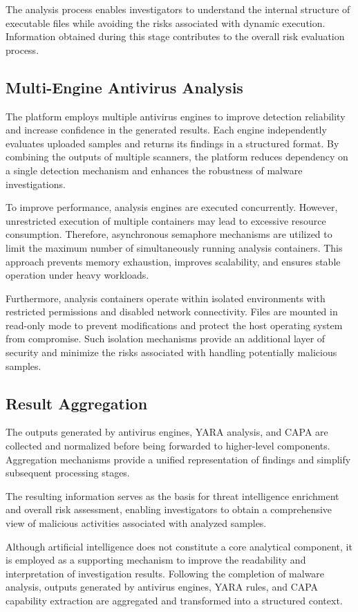 The analysis process enables investigators to understand the internal structure of executable files while avoiding the risks associated with dynamic execution. Information obtained during this stage contributes to the overall risk evaluation process.

\subsection{Multi-Engine Antivirus Analysis}
The platform employs multiple antivirus engines to improve detection reliability and increase confidence in the generated results. Each engine independently evaluates uploaded samples and returns its findings in a structured format. By combining the outputs of multiple scanners, the platform reduces dependency on a single detection mechanism and enhances the robustness of malware investigations.

To improve performance, analysis engines are executed concurrently. However, unrestricted execution of multiple containers may lead to excessive resource consumption. Therefore, asynchronous semaphore mechanisms are utilized to limit the maximum number of simultaneously running analysis containers. This approach prevents memory exhaustion, improves scalability, and ensures stable operation under heavy workloads.

Furthermore, analysis containers operate within isolated environments with restricted permissions and disabled network connectivity. Files are mounted in read-only mode to prevent modifications and protect the host operating system from compromise. Such isolation mechanisms provide an additional layer of security and minimize the risks associated with handling potentially malicious samples.

\subsection{Result Aggregation}
The outputs generated by antivirus engines, YARA analysis, and CAPA are collected and normalized before being forwarded to higher-level components. Aggregation mechanisms provide a unified representation of findings and simplify subsequent processing stages.

The resulting information serves as the basis for threat intelligence enrichment and overall risk assessment, enabling investigators to obtain a comprehensive view of malicious activities associated with analyzed samples.

Although artificial intelligence does not constitute a core analytical component, it is employed as a supporting mechanism to improve the readability and interpretation of investigation results. Following the completion of malware analysis, outputs generated by antivirus engines, YARA rules, and CAPA capability extraction are aggregated and transformed into a structured context.

